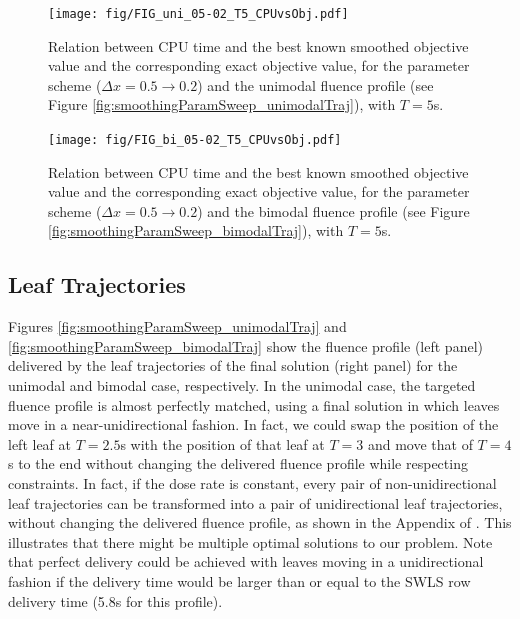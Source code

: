 \documentclass{iopart}
\begin{document}
\begin{figure}
  \centering
  \texttt{[image: fig/FIG\_uni\_05-02\_T5\_CPUvsObj.pdf]}
  \caption{Relation between CPU time and the best known smoothed objective value and the corresponding exact objective value, for the parameter scheme ($\Delta x= 0.5 \to 0.2$) and the unimodal fluence profile (see Figure \ref{fig:smoothingParamSweep_unimodalTraj}), with $T=5$s.}
  \label{fig:CPUvsObj_bestalpha_uni}
\end{figure}

\begin{figure}
  \centering
  \texttt{[image: fig/FIG\_bi\_05-02\_T5\_CPUvsObj.pdf]}
  \caption{Relation between CPU time and the best known smoothed objective value and the corresponding exact objective value, for the parameter scheme ($\Delta x= 0.5 \to 0.2$) and the bimodal fluence profile (see Figure \ref{fig:smoothingParamSweep_bimodalTraj}), with $T=5$s.}
  \label{fig:CPUvsObj_bestalpha_bi}
\end{figure}

\subsection{Leaf Trajectories}
Figures \ref{fig:smoothingParamSweep_unimodalTraj} and \ref{fig:smoothingParamSweep_bimodalTraj} show the fluence profile (left panel) delivered by the leaf trajectories of the final solution (right panel) for the unimodal and bimodal case, respectively.
In the unimodal case, the targeted fluence profile is almost perfectly matched, using a final solution in which leaves move in a near-unidirectional fashion.
In fact, we could swap the position of the left leaf at $T=2.5$s with the position of that leaf at $T=3$ and move that of $T=4$s to the end without changing the delivered fluence profile while respecting constraints.
In fact, if the dose rate is constant, every pair of non-unidirectional leaf trajectories can be transformed into a pair of unidirectional leaf trajectories, without changing the delivered fluence profile, as shown in the Appendix of \cite{balvertcraft}.
This illustrates that there might be multiple optimal solutions to our problem.
Note that perfect delivery could be achieved with leaves moving in a unidirectional fashion if the delivery time would be larger than or equal to the SWLS row delivery time (5.8s for this profile).
\end{document}
